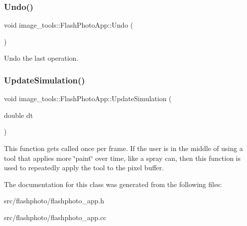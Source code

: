 \subsubsection{\texorpdfstring{Undo()}{Undo()}}
{\footnotesize\ttfamily void image\+\_\+tools\+::\+Flash\+Photo\+App\+::\+Undo (\begin{DoxyParamCaption}{ }\end{DoxyParamCaption})}

Undo the last operation. \mbox{\label{classimage__tools_1_1FlashPhotoApp_af69350137d0f9f7501853d23a72c7f4e}} 
\subsubsection{\texorpdfstring{Update\+Simulation()}{UpdateSimulation()}}
{\footnotesize\ttfamily void image\+\_\+tools\+::\+Flash\+Photo\+App\+::\+Update\+Simulation (\begin{DoxyParamCaption}\item[{double}]{dt }\end{DoxyParamCaption})\hspace{0.3cm}{\ttfamily [override]}}

This function gets called once per frame. If the user is in the middle of using a tool that applies more \char`\"{}paint\char`\"{} over time, like a spray can, then this function is used to repeatedly apply the tool to the pixel buffer. 

The documentation for this class was generated from the following files\+:\begin{DoxyCompactItemize}
\item 
src/flashphoto/flashphoto\+\_\+app.\+h\item 
src/flashphoto/flashphoto\+\_\+app.\+cc\end{DoxyCompactItemize}
